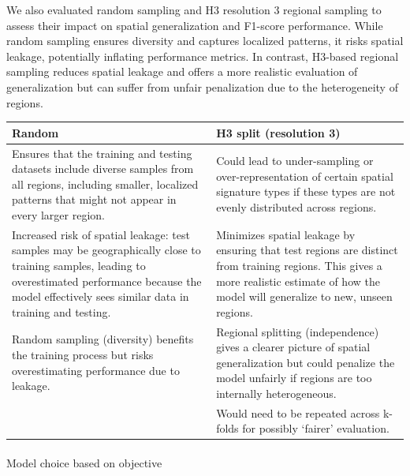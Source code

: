 \documentclass[
  letterpaper,
  DIV=11,
  numbers=noendperiod]{scrartcl}
\makeatletter
\let\oldparagraph\paragraph
\renewcommand{\paragraph}{
    \@ifstar
      \xxxParagraphStar
      \xxxParagraphNoStar
  }
\newcommand{\xxxParagraphStar}[1]{\oldparagraph*{#1}\mbox{}}
\newcommand{\xxxParagraphNoStar}[1]{\oldparagraph{#1}\mbox{}}
\makeatother
\begin{document}
We also evaluated random sampling and H3 resolution 3 regional sampling
to assess their impact on spatial generalization and F1-score
performance. While random sampling ensures diversity and captures
localized patterns, it risks spatial leakage, potentially inflating
performance metrics. In contrast, H3-based regional sampling reduces
spatial leakage and offers a more realistic evaluation of generalization
but can suffer from unfair penalization due to the heterogeneity of
regions.

\begin{longtable}[]{@{}
  >{\raggedright\arraybackslash}p{}
  >{\raggedright\arraybackslash}p{}@{}}
\toprule\noalign{}
\begin{minipage}[b]{\linewidth}\raggedright
Random
\end{minipage} & \begin{minipage}[b]{\linewidth}\raggedright
H3 split (resolution 3)
\end{minipage} \\
\midrule\noalign{}
\endhead
\bottomrule\noalign{}
\endlastfoot
Ensures that the training and testing datasets include diverse samples
from all regions, including smaller, localized patterns that might not
appear in every larger region. & Could lead to under-sampling or
over-representation of certain spatial signature types if these types
are not evenly distributed across regions. \\
Increased risk of spatial leakage: test samples may be geographically
close to training samples, leading to overestimated performance because
the model effectively sees similar data in training and testing. &
Minimizes spatial leakage by ensuring that test regions are distinct
from training regions. This gives a more realistic estimate of how the
model will generalize to new, unseen regions. \\
Random sampling (diversity) benefits the training process but risks
overestimating performance due to leakage. & Regional splitting
(independence) gives a clearer picture of spatial generalization but
could penalize the model unfairly if regions are too internally
heterogeneous. \\
& Would need to be repeated across k-folds for possibly `fairer'
evaluation. \\
\end{longtable}

\paragraph{Model choice based on
objective}\label{model-choice-based-on-objective}
\end{document}
